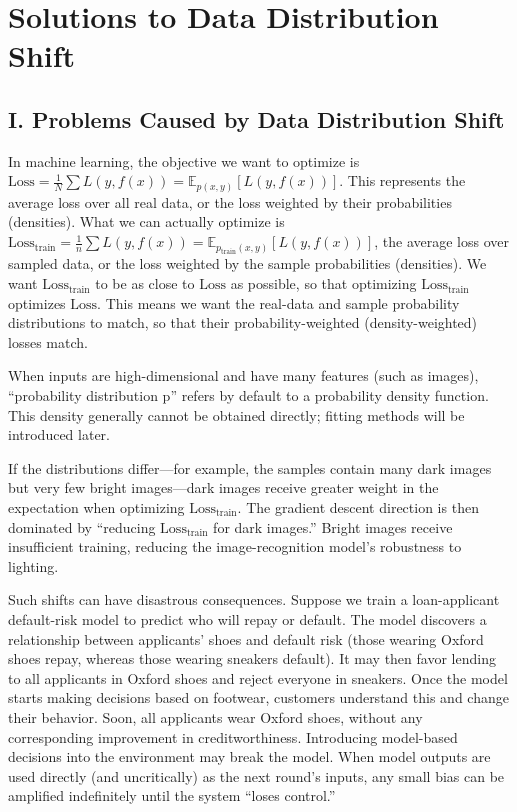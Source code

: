 \setcounter{section}{4}

\hypertarget{solutions-to-data-distribution-shift}{%
\section{Solutions to Data Distribution Shift}\label{solutions-to-data-distribution-shift}}

\hypertarget{i.-problems-caused-by-data-distribution-shift}{%
\subsection{I. Problems Caused by Data Distribution Shift}\label{i.-problems-caused-by-data-distribution-shift}}

In machine learning, the objective we want to optimize is \(\mathrm{Loss}=\frac{1}{N}\sum L(y,f(x))=\mathbb{E}_{p(x,y)}[L(y,f(x))]\). This represents the average loss over all real data, or the loss weighted by their probabilities (densities). What we can actually optimize is \(\mathrm{Loss}_{\mathrm{train}}=\frac{1}{n}\sum L(y,f(x))=\mathbb{E}_{p_{\mathrm{train}}(x,y)}[L(y,f(x))]\), the average loss over sampled data, or the loss weighted by the sample probabilities (densities). We want \(\mathrm{Loss}_{\mathrm{train}}\) to be as close to \(\mathrm{Loss}\) as possible, so that optimizing \(\mathrm{Loss}_{\mathrm{train}}\) optimizes \(\mathrm{Loss}\). This means we want the real-data and sample probability distributions to match, so that their probability-weighted (density-weighted) losses match.

When inputs are high-dimensional and have many features (such as images), ``probability distribution p'' refers by default to a probability density function. This density generally cannot be obtained directly; fitting methods will be introduced later.

If the distributions differ---for example, the samples contain many dark images but very few bright images---dark images receive greater weight in the expectation when optimizing \(\mathrm{Loss}_{\mathrm{train}}\). The gradient descent direction is then dominated by ``reducing \(\mathrm{Loss}_{\mathrm{train}}\) for dark images.'' Bright images receive insufficient training, reducing the image-recognition model's robustness to lighting.

Such shifts can have disastrous consequences. Suppose we train a loan-applicant default-risk model to predict who will repay or default. The model discovers a relationship between applicants' shoes and default risk (those wearing Oxford shoes repay, whereas those wearing sneakers default). It may then favor lending to all applicants in Oxford shoes and reject everyone in sneakers. Once the model starts making decisions based on footwear, customers understand this and change their behavior. Soon, all applicants wear Oxford shoes, without any corresponding improvement in creditworthiness. Introducing model-based decisions into the environment may break the model. When model outputs are used directly (and uncritically) as the next round's inputs, any small bias can be amplified indefinitely until the system ``loses control.''

